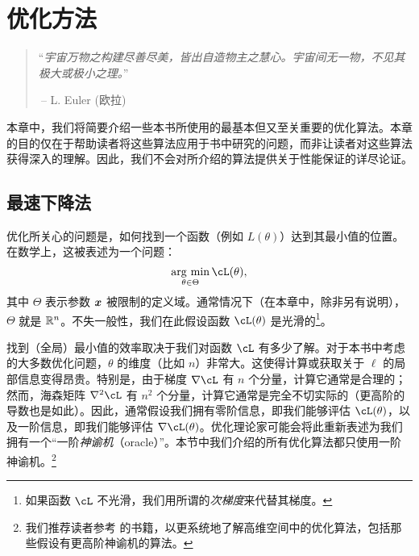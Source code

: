 \documentclass[../../book-main_zh.tex]{subfiles}
\begin{document}
\chapter{优化方法}
\label{app:optimization}

\begin{quote}
“{\em 宇宙万物之构建尽善尽美，皆出自造物主之慧心。宇宙间无一物，不见其极大或极小之理。}”

$~$\hfill -- L. Euler (欧拉)
 \end{quote}
\vspace{5mm}

本章中，我们将简要介绍一些本书所使用的最基本但又至关重要的优化算法。本章的目的仅在于帮助读者将这些算法应用于书中研究的问题，而非让读者对这些算法获得深入的理解。因此，我们不会对所介绍的算法提供关于性能保证的详尽论证。

\section{最速下降法}


优化所关心的问题是，如何找到一个函数（例如 \(L(\theta)\)）达到其最小值的位置。在数学上，这被表述为一个问题：
\begin{equation}
    \argmin_{\theta \in \Theta} \cL(\theta),
\end{equation}
其中 \(\Theta\) 表示参数 \(\bm{x}\) 被限制的定义域。通常情况下（在本章中，除非另有说明），\(\Theta\) 就是 \(\mathbb{R}^n\)。不失一般性，我们在此假设函数 \(\cL(\theta)\) 是光滑的\footnote{如果函数 \(\cL\) 不光滑，我们用所谓的\textit{次梯度}来代替其梯度。}。

找到（全局）最小值的效率取决于我们对函数 \(\cL\) 有多少了解。对于本书中考虑的大多数优化问题，\(\theta\) 的维度（比如 \(n\)）非常大。这使得计算或获取关于 \(\ell\) 的局部信息变得昂贵。特别是，由于梯度 \(\nabla \cL\) 有 \(n\) 个分量，计算它通常是合理的；然而，海森矩阵 \(\nabla^{2} \cL\) 有 \(n^{2}\) 个分量，计算它通常是完全不切实际的（更高阶的导数也是如此）。因此，通常假设我们拥有零阶信息，即我们能够评估 \(\cL(\theta)\)，以及一阶信息，即我们能够评估 \(\nabla \cL(\theta)\)。优化理论家可能会将此重新表述为我们拥有一个“一阶\textit{神谕机}（oracle）”。本节中我们介绍的所有优化算法都只使用一阶神谕机。\footnote{我们推荐读者参考 \cite{Wright-Ma-2022} 的书籍，以更系统地了解高维空间中的优化算法，包括那些假设有更高阶神谕机的算法。}
\end{document}
